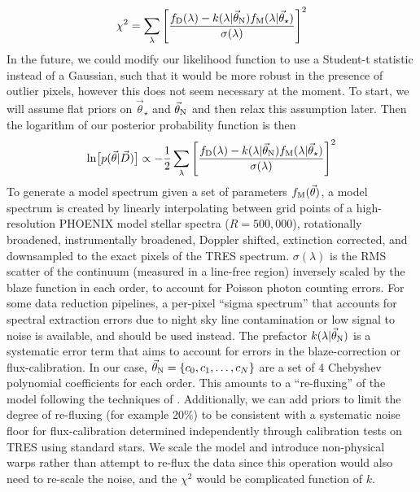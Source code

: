 \documentclass[preprint]{aastex} %
\newcommand{\vt}{\vec{\theta}}
\newcommand{\vstar}{\vt_{\star}}
\newcommand{\vN}{\vt_{\rm N}}
\newcommand{\fM}{f_{\rm M}}
\newcommand{\fD}{f_{\rm D}}
\newcommand{\vD}{\vec{D}}
\begin{document}
\begin{equation}
  \chi^2 = \sum_\lambda \left [\frac{ \fD(\lambda) - k(\lambda | \vN) \fM(\lambda | \vstar) }{\sigma(\lambda)} \right ]^2
\end{equation}
In the future, we could modify our likelihood function to use a Student-t statistic instead of a Gaussian, such that it would be more robust in the presence of outlier pixels, however this does not seem necessary at the moment. To start, we will assume flat priors on $\vstar$ and $\vN$ and then relax this assumption later. Then the logarithm of our posterior probability function is then
\begin{equation}
  \ln \bigl [p(\vt | \vD) \bigr] \propto - \frac{1}{2} \sum_\lambda \left [\frac{ \fD(\lambda) - k(\lambda | \vN) \fM(\lambda | \vstar) }{\sigma(\lambda)} \right ]^2
  \label{eqn:lnprob}
\end{equation}
To generate a model spectrum given a set of parameters $\fM(\vt)$, a model spectrum is created by linearly interpolating between grid points of a high-resolution PHOENIX model stellar spectra ($R = 500,000$), rotationally broadened, instrumentally broadened, Doppler shifted, extinction corrected, and downsampled to the exact pixels of the TRES spectrum. $\sigma(\lambda)$ is the RMS scatter of the continuum (measured in a line-free region) inversely scaled by the blaze function in each order, to account for Poisson photon counting errors. For some data reduction pipelines, a per-pixel ``sigma spectrum'' that accounts for spectral extraction errors due to night sky line contamination or low signal to noise is available, and should be used instead. The prefactor $k(\lambda | \vN)$ is a systematic error term that aims to account for errors in the blaze-correction or flux-calibration. In our case, $\vN = \{c_0, c_1, \ldots, c_N\}$ are a set of 4 Chebyshev polynomial coefficients for each order. This amounts to a ``re-fluxing'' of the model following the techniques of \citet{elh+06}. Additionally, we can add priors to limit the degree of re-fluxing (for example 20\%) to be consistent with a systematic noise floor for flux-calibration determined independently through calibration tests on TRES using standard stars. We scale the model and introduce non-physical warps rather than attempt to re-flux the data since this operation would also need to re-scale the noise, and the $\chi^2$ would be complicated function of $k$.
\end{document}
